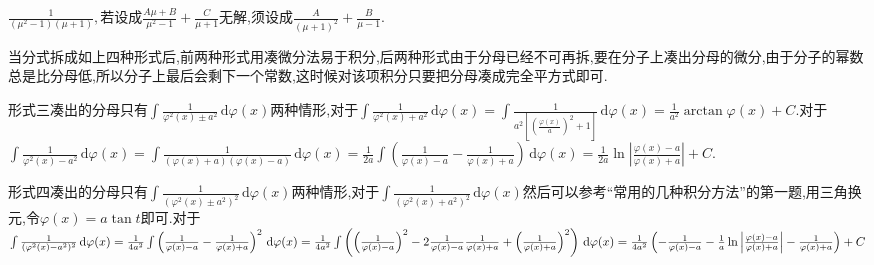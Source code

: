 $\frac{1}{(\mu^2-1)(\mu+1)},$若设成$\frac{A\mu+B}{\mu^2-1}+\frac{C}{\mu+1}$无解,须设成$\frac{A}{(\mu+1)^2}+\frac{B}{\mu-1}$.

当分式拆成如上四种形式后,前两种形式用凑微分法易于积分,后两种形式由于分母已经不可再拆,要在分子上凑出分母的微分,由于分子的幂数总是比分母低,所以分子上最后会剩下一个常数,这时候对该项积分只要把分母凑成完全平方式即可.

形式三凑出的分母只有$\int \frac{1}{\varphi ^2(x)\pm a^2} \,\mathrm{d}\varphi (x) $两种情形,对于$\int \frac{1}{\varphi ^2(x)+ a^2} \,\mathrm{d}\varphi (x) =\int \frac{1}{a^2\left[(\frac{\varphi (x)}{a})^2+1\right] } \,\mathrm{d}\varphi (x) =\frac{1}{a^2}\arctan \varphi (x) +C$.对于$\int \frac{1}{\varphi ^2(x)- a^2} \,\mathrm{d}\varphi (x) =\int \frac{1}{(\varphi (x)+a)(\varphi (x)-a)} \,\mathrm{d}\varphi (x) =\frac{1}{2a}\int \left(\frac{1}{\varphi (x)-a}-\frac{1}{\varphi (x)+a}\right)  \,\mathrm{d}\varphi (x) =\frac{1}{2a}\ln \left\lvert \frac{\varphi (x)-a}{\varphi (x)+a}\right\rvert +C$.

形式四凑出的分母只有$\int \frac{1}{(\varphi ^2(x)\pm a^2)^2} \,\mathrm{d}\varphi (x) $两种情形,对于$\int \frac{1}{(\varphi ^2(x)+ a^2)^2} \,\mathrm{d}\varphi (x)$然后可以参考“常用的几种积分方法”的第一题,用三角换元,令$\varphi (x) =a\tan t$即可.对于$\int \frac{1}{(\varphi ^2(x)- a^2)^2} \,\mathrm{d}\varphi (x)=\frac{1}{4a^2}\int \left(\frac{1}{\varphi (x)-a}-\frac{1}{\varphi (x)+a}\right) ^2 \,\mathrm{d}\varphi (x) \\
=\frac{1}{4a^2}\int \left(\left(\frac{1}{\varphi (x)-a}\right) ^2-2\frac{1}{\varphi (x)-a}\frac{1}{\varphi (x)+a}+\left(\frac{1}{\varphi (x)+a}\right) ^2\right) \,\mathrm{d}\varphi (x) \\
=\frac{1}{4a^2}\left(-\frac{1}{\varphi (x)-a}-\frac{1}{a}\ln\left\lvert \frac{\varphi (x)-a}{\varphi (x)+a}\right\rvert -\frac{1}{\varphi (x)+a}\right) +C$

